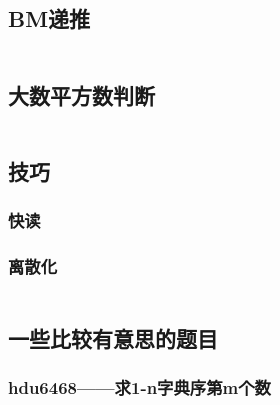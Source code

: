 \documentclass[a4paper,11pt]{article}
\begin{document}
\subsection{BM递推}
\inputminted[]{c++}{Template/Other/BM.cpp}
\subsection{大数平方数判断}
\inputminted[]{java}{Template/Other/IsSquare.java}
\subsection{技巧}
\subsubsection{快读}
\subsubsection{离散化}
\inputminted[]{c++}{Template/Other/Discretization.cpp}
\subsection{一些比较有意思的题目}
\subsubsection{hdu6468——求1-n字典序第m个数}
\inputminted[]{c++}{Template/Other/hdu6468.cpp}



\end{document}
